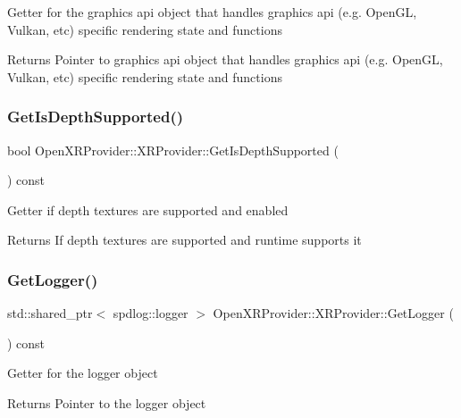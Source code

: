 Getter for the graphics api object that handles graphics api (e.\+g. Open\+GL, Vulkan, etc) specific rendering state and functions \begin{DoxyReturn}{Returns}
Pointer to graphics api object that handles graphics api (e.\+g. Open\+GL, Vulkan, etc) specific rendering state and functions 
\end{DoxyReturn}
\mbox{\label{class_open_x_r_provider_1_1_x_r_provider_a20c6d026a126738127ed300039ff72e1}} 
\subsubsection{\texorpdfstring{GetIsDepthSupported()}{GetIsDepthSupported()}}
{\footnotesize\ttfamily bool Open\+X\+R\+Provider\+::\+X\+R\+Provider\+::\+Get\+Is\+Depth\+Supported (\begin{DoxyParamCaption}{ }\end{DoxyParamCaption}) const\hspace{0.3cm}{\ttfamily [inline]}}

Getter if depth textures are supported and enabled \begin{DoxyReturn}{Returns}
If depth textures are supported and runtime supports it 
\end{DoxyReturn}
\mbox{\label{class_open_x_r_provider_1_1_x_r_provider_a985813ed6da86367d311836533466f7b}} 
\subsubsection{\texorpdfstring{GetLogger()}{GetLogger()}}
{\footnotesize\ttfamily std\+::shared\+\_\+ptr$<$ spdlog\+::logger $>$ Open\+X\+R\+Provider\+::\+X\+R\+Provider\+::\+Get\+Logger (\begin{DoxyParamCaption}{ }\end{DoxyParamCaption}) const\hspace{0.3cm}{\ttfamily [inline]}}

Getter for the logger object \begin{DoxyReturn}{Returns}
Pointer to the logger object 
\end{DoxyReturn}
\mbox{\label{class_open_x_r_provider_1_1_x_r_provider_adcfd16c34593dd486444db07f5a6d6b8}} 
